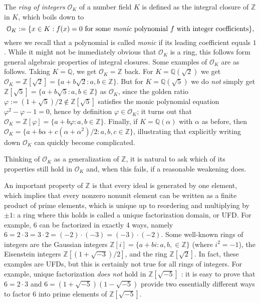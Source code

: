 \documentclass[a4paper,USenglish,cleveref, autoref, thm-restate]{lipics-v2021}
\newcommand*{\OK}[1][K]{\mathcal{O}_{#1}}
\newcommand{\Q}{\mathbb{Q}}
\newcommand{\Z}{\mathbb{Z}}
\begin{document}
The \emph{ring of integers} $\OK$ of a number field $K$ is defined as the integral closure of $\Z$ in $K$, which boils down to
\[
  \OK := \{x \in K : f(x)=0 \text{ for some \emph{monic} polynomial } f \text{ with integer coefficients}\},\]
where we recall that a polynomial is called \emph{monic} if its leading coefficient equals $1$.
While it might not be immediately obvious that $\OK$ is a ring, this follows form general algebraic properties of integral closures.
Some examples of $\OK$ are as follows. Taking $K=\Q$, we get $\OK=\Z$ back. For $K=\Q(\sqrt{2})$ we get $\OK=\Z[\sqrt{2}]=\{a+b\sqrt{2} : a,b \in \Z\}$. But for $K=\Q(\sqrt{5})$ we do \emph{not} simply get $\Z[\sqrt{5}]=\{a+b\sqrt{5} : a,b \in \Z\}$ as $\OK$, since the golden ratio $\varphi:=(1+\sqrt{5})/2\not\in \Z[\sqrt{5}]$ satisfies the monic polynomial equation $\varphi^2-\varphi-1=0$, hence by definition $\varphi \in \OK$; it turns out that $\OK=\Z[\varphi]=\{a+b\varphi : a,b \in \Z\}$. %
Finally, if $K=\Q(\alpha)$ with $\alpha$ as before, then $\OK=\{a+b \alpha+c (\alpha+\alpha^2)/2 : a,b,c \in \Z\}$, illustrating that explicitly writing down $\OK$ can quickly become complicated.

Thinking of $\OK$ as a generalization of $\Z$, it is natural to ask which of its properties %
still hold in $\OK$ and, when this fails, if a reasonable weakening does. %

An important property of $\Z$ is that every ideal is generated by one element, which implies that every nonzero nonunit element can be written as a %
finite product of prime elements, which is unique up to reordering and multiplying by $\pm 1$: a ring where this holds is called a unique factorization domain, or UFD. %
For example, $6$ can be factorized in exactly 4 ways, namely $6=2\cdot 3=3\cdot2=(-2)\cdot (-3)=(-3) \cdot (-2)$. Some well-known rings of integers are the Gaussian integers $\Z[i]=\{a+b i : a,b, \in \Z\}$ (where $i^2=-1$), the Eisenstein integers $\Z[(1+\sqrt{-3})/2]$, and the %
ring $\Z[\sqrt{2}]$. In fact, these examples are UFDs, but this is certainly not true for all rings of integers. For example, unique factorization \emph{does not} hold in $\Z[\sqrt{-5}]$%
: it is easy to prove that $6=2\cdot3$ and $6=(1+\sqrt{-5}) (1-\sqrt{-5})$ provide two essentially different ways to factor $6$ into prime elements of $\Z[\sqrt{-5}]$.
\end{document}
